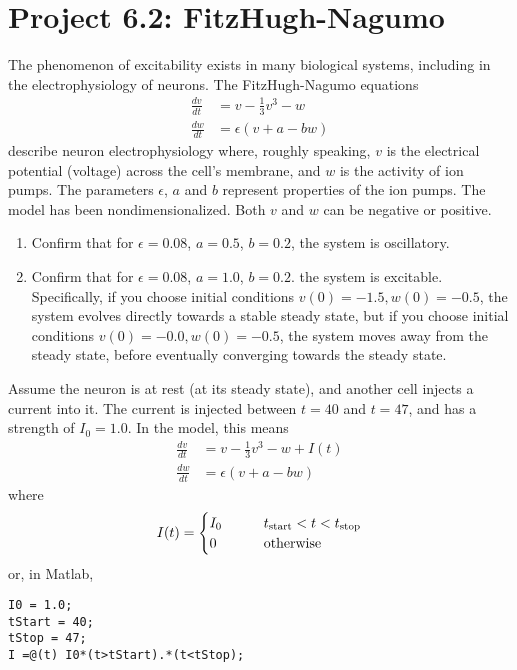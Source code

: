 \documentclass{exam}
\begin{document}
\section*{Project 6.2: FitzHugh-Nagumo}
 
 
 The phenomenon of excitability exists in many biological systems, including in the electrophysiology of neurons. The FitzHugh-Nagumo equations
 \begin{align}
 \frac{d v}{dt} &= v - \frac{1}{3} v^3 - w \\
 \frac{d w}{dt} &= \epsilon \left( v + a - bw\right)
 \end{align}
 describe neuron electrophysiology where, roughly speaking, $v$ is the electrical potential (voltage) across the cell's membrane, and $w$ is the activity of ion pumps. The parameters $\epsilon$, $a$ and $b$ represent properties of the ion pumps. The model has been nondimensionalized. Both $v$ and $w$ can be negative or positive.
 
 
\begin{enumerate}
\item Confirm that for $\epsilon=0.08$, $a=0.5$, $b=0.2$, the system is oscillatory.
\item Confirm that for $\epsilon=0.08$, $a=1.0$, $b=0.2$. the system is excitable. Specifically, if you choose initial conditions $v(0)=-1.5, w(0)=-0.5$, the system evolves directly towards a stable steady state, but if you choose initial conditions $v(0)=-0.0, w(0)=-0.5$, the system moves away from the steady state, before eventually converging towards the steady state.
\end{enumerate}

Assume the neuron is at rest (at its steady state), and another cell injects a current into it. The current is injected between $t=40$ and $t=47$, and has a strength of $I_0=1.0$. In the model, this means 
 \begin{align}
 \frac{d v}{dt} &= v - \frac{1}{3} v^3 - w +I(t)\\
 \frac{d w}{dt} &= \epsilon \left( v + a - bw\right) 
 \end{align}
 where 
 \begin{equation}
 I(t) = \begin{cases}
 I_0 & \qquad t_{\rm start}<t < t_{\rm stop}\\
 0 & \qquad \mbox{otherwise}
 \end{cases}
 \end{equation}
or, in Matlab,
\begin{lstlisting}
I0 = 1.0;
tStart = 40;
tStop = 47;
I =@(t) I0*(t>tStart).*(t<tStop);
\end{lstlisting}
\end{document}
